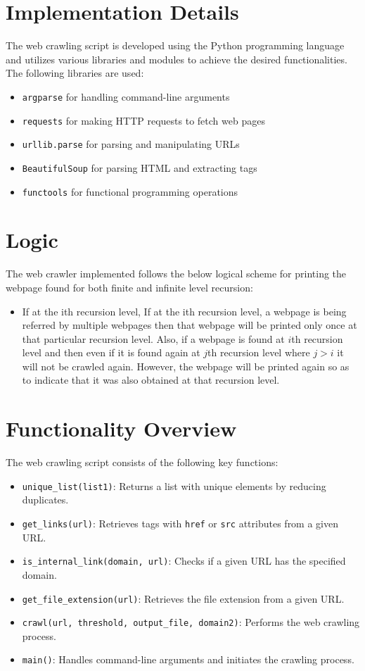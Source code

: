 \documentclass{article}
\begin{document}
\section{Implementation Details}
The web crawling script is developed using the Python programming language and utilizes various libraries and modules to achieve the desired functionalities. The following libraries are used:
\begin{itemize}
    \item \texttt{argparse} for handling command-line arguments
    \item \texttt{requests} for making HTTP requests to fetch web pages
    \item \texttt{urllib.parse} for parsing and manipulating URLs
    \item \texttt{BeautifulSoup} for parsing HTML and extracting tags
    \item \texttt{functools} for functional programming operations
\end{itemize}

\section{Logic}
The web crawler implemented follows the below logical scheme for printing the webpage found for both finite and infinite level recursion: \\ 
\begin{itemize}
\item{If at the ith recursion level, If at the ith recursion level, a webpage is being referred by multiple webpages then that webpage will be printed only once at that particular recursion level. Also, if a webpage is found at $i$th recursion level and then even if it is found again at $j$th recursion level where $j > i$ it will not be crawled again. However, the webpage will be printed again so as to indicate that it was also obtained at that recursion level.}
\end{itemize}

\section{Functionality Overview}
The web crawling script consists of the following key functions:

\begin{itemize}
    \item \texttt{unique\_list(list1)}: Returns a list with unique elements by reducing duplicates.
    \item \texttt{get\_links(url)}: Retrieves tags with \texttt{href} or \texttt{src} attributes from a given URL.
    \item \texttt{is\_internal\_link(domain, url)}: Checks if a given URL has the specified domain.
    \item \texttt{get\_file\_extension(url)}: Retrieves the file extension from a given URL.
    \item \texttt{crawl(url, threshold, output\_file, domain2)}: Performs the web crawling process.
    \item \texttt{main()}: Handles command-line arguments and initiates the crawling process.
\end{itemize}
\end{document}
